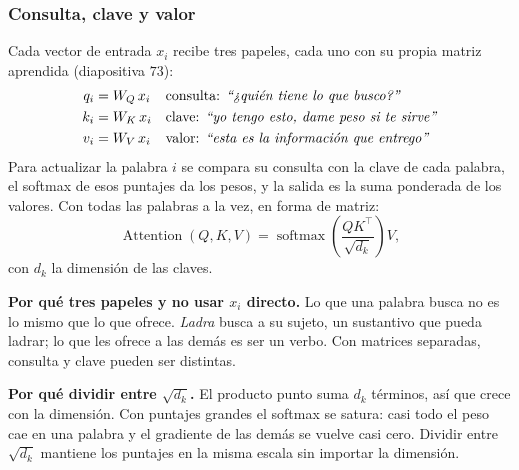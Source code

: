 \documentclass[11pt,letterpaper]{article}
\begin{document}
\subsubsection*{Consulta, clave y valor}

Cada vector de entrada $x_i$ recibe tres papeles, cada uno con su
propia matriz aprendida (diapositiva $73$):
\begin{align*}
    q_i &= W_Q\, x_i
        & &\text{consulta: \textit{``¿quién tiene lo que busco?''}} \\
    k_i &= W_K\, x_i
        & &\text{clave: \textit{``yo tengo esto, dame peso si te
              sirve''}} \\
    v_i &= W_V\, x_i
        & &\text{valor: \textit{``esta es la información que
              entrego''}}
\end{align*}
Para actualizar la palabra $i$ se compara su consulta con la clave de
cada palabra, el softmax de esos puntajes da los pesos, y la salida es
la suma ponderada de los valores. Con todas las palabras a la vez, en
forma de matriz:
\[
    \operatorname{Attention}(Q, K, V)
    = \operatorname{softmax}\!\left(\frac{Q K^{\top}}{\sqrt{d_k}}
      \right) V ,
\]
con $d_k$ la dimensión de las claves.

\textbf{Por qué tres papeles y no usar $x_i$ directo.} Lo que una
palabra busca no es lo mismo que lo que ofrece. \textit{Ladra} busca a
su sujeto, un sustantivo que pueda ladrar; lo que les ofrece a las
demás es ser un verbo. Con matrices separadas, consulta y clave pueden
ser distintas.

\textbf{Por qué dividir entre $\sqrt{d_k}$.} El producto punto suma
$d_k$ términos, así que crece con la dimensión. Con puntajes grandes el
softmax se satura: casi todo el peso cae en una palabra y el gradiente
de las demás se vuelve casi cero. Dividir entre $\sqrt{d_k}$ mantiene
los puntajes en la misma escala sin importar la dimensión.
\end{document}

